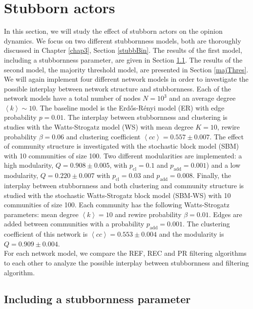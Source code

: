 \documentclass[11 pt , letterpaper , twoside , openright]{book}
\begin{document}
\section{Stubborn actors}

In this section, we will study the effect of stubborn actors on the opinion dynamics. We focus on two different stubbornness models, both are thoroughly discussed in Chapter \ref{chap3}, Section \ref{stubbBin}. The results of the first model, including a stubbornness parameter, are given in Section \ref{stubbpar}. The results of the second model, the majority threshold model, are presented in Section \ref{majThres}.\\
\newline
We will again implement four different network models in order to investigate the possible interplay between network structure and stubbornness. Each of the network models have a total number of nodes $N=10^3$ and an average degree $\left<k\right> \sim 10$. The baseline model is the Erd\H{o}s-R\'{e}nyi model (ER) with edge probability $p = 0.01$. The interplay between stubbornness and clustering is studies with the Watts-Strogatz model (WS) with mean degree $K=10$, rewire probability $\beta = 0.06$ and clustering coefficient $\left<cc\right> = 0.557 \pm 0.007$. The effect of community structure is investigated with the stochastic block model (SBM) with 10 communities of size 100. Two different modularities are implemented: a high modularity, $Q = 0.908 \pm 0.005$, with $p_{\text{cl}} = 0.1$ and $p_{\text{add}} = 0.001$) and a low modularity, $Q = 0.220 \pm 0.007$ with $p_{\text{cl}} = 0.03$ and $p_{\text{add}} = 0.008$. Finally, the interplay between stubbornness and both clustering and community structure is studied with the stochastic Watts-Strogatz block model (SBM-WS) with 10 communities of size 100. Each community has the following Watts-Strogatz parameters: mean degree $\left<k\right> = 10$ and rewire probability $\beta = 0.01$. Edges are added between communities with a probability $p_{\text{add}} = 0.001$. The clustering coefficient of this network is $\left<cc\right> = 0.553 \pm 0.004$ and the modularity is $Q = 0.909 \pm 0.004$.\\
\newline
For each network model, we compare the REF, REC and PR filtering algorithms to each other to analyze the possible interplay between stubbornness and filtering algorithm.

\subsection{Including a stubbornness parameter}
\label{stubbpar}
\end{document}
